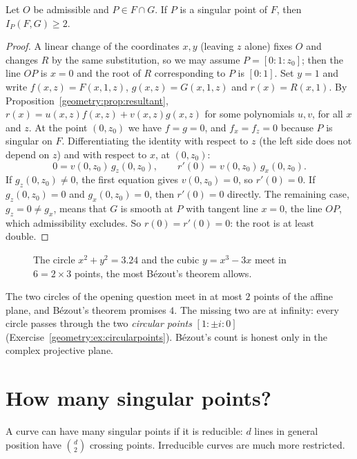 \begin{lemma}\label{geometry:lem:singularmult}
Let $O$ be admissible and $P\in F\cap G$. If $P$ is a singular point of $F$, then $I_P(F,G)\ge2$.
\end{lemma}

\begin{proof}
A linear change of the coordinates $x,y$ (leaving $z$ alone) fixes $O$ and changes $R$ by the same substitution, so we may assume $P=[0:1:z_0]$; then the
line $OP$ is $x=0$ and the root of $R$ corresponding to $P$ is $[0:1]$. Set $y=1$ and write $f(x,z)=F(x,1,z)$, $g(x,z)=G(x,1,z)$ and $r(x)=R(x,1)$. By
Proposition~\ref{geometry:prop:resultant}, $r(x)=u(x,z)f(x,z)+v(x,z)g(x,z)$ for some polynomials $u,v$, for all $x$ and $z$. At the point $(0,z_0)$ we have $f=g=0$, and
$f_x=f_z=0$ because $P$ is singular on $F$. Differentiating the identity with respect to $z$ (the left side does not depend on $z$) and with respect to
$x$, at $(0,z_0)$:
\[
0=v(0,z_0)\,g_z(0,z_0),\qquad r'(0)=v(0,z_0)\,g_x(0,z_0).
\]
If $g_z(0,z_0)\ne0$, the first equation gives $v(0,z_0)=0$, so $r'(0)=0$. If $g_z(0,z_0)=0$ and $g_x(0,z_0)=0$, then $r'(0)=0$ directly. The remaining case,
$g_z=0\ne g_x$, means that $G$ is smooth at $P$ with tangent line $x=0$, the line $OP$, which admissibility excludes. So $r(0)=r'(0)=0$: the root is at
least double.
\end{proof}

\begin{figure}[ht]
\centering
{}
\caption{The circle $x^2+y^2=3.24$ and the cubic $y=x^3-3x$ meet in $6=2\times3$ points, the most B\'ezout's theorem allows.}
\label{geometry:fig:bezout}
\end{figure}

The two circles of the opening question meet in at most $2$ points of the affine plane, and B\'ezout's theorem promises $4$. The missing two are at
infinity: every circle passes through the two \emph{circular points} $[1:\pm i:0]$ (Exercise~\ref{geometry:ex:circularpoints}). B\'ezout's count is honest only
in the complex projective plane.

\section{How many singular points?}

A curve can have many singular points if it is reducible: $d$ lines in general position have $\binom d2$ crossing points. Irreducible curves are
much more restricted.

